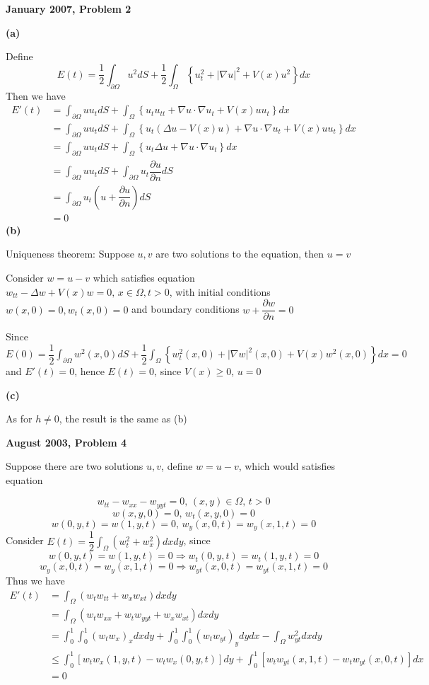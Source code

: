 \documentclass[12pt]{article}
\begin{document}
\textbf{January 2007, Problem 2} \par
\textbf{(a)} \par
Define 
\[
E(t)=\dfrac{1}{2}\int_{\partial\Omega}u^2dS+\dfrac{1}{2}\int_{\Omega}\left\{u_t^2+|\nabla u|^2+V(x)u^2\right\}dx
\]
Then we have
\[
\begin{aligned}
E'(t)
&=\int_{\partial\Omega}uu_tdS+\int_{\Omega}\left\{u_tu_{tt}+\nabla u\cdot\nabla u_t+V(x)uu_t\right\}dx \\
&=\int_{\partial\Omega}uu_tdS+\int_{\Omega}\left\{u_t\left(\Delta u-V(x)u\right)+\nabla u\cdot\nabla u_t+V(x)uu_t\right\}dx \\
&=\int_{\partial\Omega}uu_tdS+\int_{\Omega}\left\{u_t\Delta u+\nabla u\cdot\nabla u_t\right\}dx \\
&=\int_{\partial\Omega}uu_tdS+\int_{\partial\Omega}u_t\dfrac{\partial u}{\partial n}dS \\
&=\int_{\partial\Omega}u_t\left(u+\dfrac{\partial u}{\partial n}\right)dS \\
&=0
\end{aligned}
\]
\textbf{(b)} \par
Uniqueness theorem: Suppose $u,v$ are two solutions to the equation, then $u=v$ \par
Consider $w=u-v$ which satisfies equation $w_{tt}-\Delta w+V(x)w=0,\,x\in\Omega,t>0$, with initial conditions $w(x,0)=0, w_t(x,0)=0$ and boundary conditions $w+\dfrac{\partial w}{\partial n}=0$ \par
Since $\displaystyle E(0)=\dfrac{1}{2}\int_{\partial\Omega}w^2(x,0)dS+\dfrac{1}{2}\int_{\Omega}\left\{w_t^2(x,0)+|\nabla w|^2(x,0)+V(x)w^2(x,0)\right\}dx=0$ and $E'(t)=0$, hence $E(t)=0$, since $V(x)\geq 0$, $u=0$ \par
\textbf{(c)} \par
As for $h\neq 0$, the result is the same as (b) \par
\textbf{August 2003, Problem 4} \par
Suppose there are two solutions $u,v$, define $w=u-v$, which would satisfies equation \par
\[w_{tt}-w_{xx}-w_{yyt}=0,\,(x,y)\in\Omega,\,t>0\]\[w(x,y,0)=0,\,w_{t}(x,y,0)=0\]\[w(0,y,t)=w(1,y,t)=0,\,w_y(x,0,t)=w_y(x,1,t)=0\]
Consider $\displaystyle E(t)=\dfrac{1}{2}\int_{\Omega}(w_t^2+w_x^2)dxdy$, since
\[w(0,y,t)=w(1,y,t)=0 \Rightarrow w_t(0,y,t)=w_t(1,y,t)=0\]\[w_y(x,0,t)=w_y(x,1,t)=0 \Rightarrow w_{yt}(x,0,t)=w_{yt}(x,1,t)=0\]
Thus we have
\[
\begin{aligned}
E'(t)
&=\int_{\Omega}(w_tw_{tt}+w_xw_{xt})dxdy \\
&=\int_{\Omega}(w_tw_{xx}+w_tw_{yyt}+w_xw_{xt})dxdy \\
&=\int_0^1\int_0^1(w_tw_x)_xdxdy+\int_0^1\int_0^1(w_tw_{yt})_ydydx-\int_{\Omega}w_{yt}^2dxdy \\
&\leq \int_0^1[w_tw_x(1,y,t)-w_tw_x(0,y,t)]dy+\int_0^1[w_tw_{yt}(x,1,t)-w_tw_{yt}(x,0,t)]dx \\
&=0
\end{aligned}
\]
\end{document}
